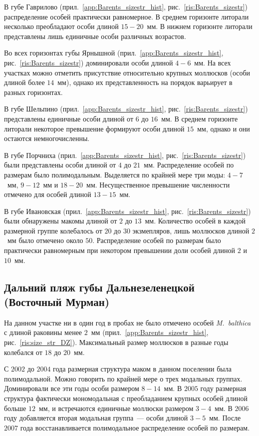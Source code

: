 В губе Гаврилово (прил.~\ref{app:Barents_sizestr_hist}, рис.~\ref{ris:Barents_sizestr}) распределение особей практически равномерное. 
В среднем горизонте литорали несколько преобладают особи длиной $15-20$~мм. 
В нижнем горизонте литорали представлены лишь единичные особи различных возрастов.	

Во всех горизонтах губы Ярнышной (прил.~\ref{app:Barents_sizestr_hist}, рис.~\ref{ris:Barents_sizestr}) доминировали особи длиной $4-6$~мм. 
На всех участках можно отметить присутствие относительно крупных моллюсков (особи длиной более $14$~мм), однако их представленность на порядок варьирует в разных горизонтах.

В губе Шельпино (прил.~\ref{app:Barents_sizestr_hist}, рис.~\ref{ris:Barents_sizestr})  представлены единичные особи длиной от $6$ до $16$~мм. 
В среднем горизонте литорали некоторое превышение формируют особи длиной $15$~мм, однако и они остаются немногочисленны.

В губе Порчниха (прил.~\ref{app:Barents_sizestr_hist}, рис.~\ref{ris:Barents_sizestr}) были представлены особи длиной от $4$ до $21$~мм. 
Распределение особей по размерам было полимодальным. 
Выделяется по крайней мере три моды: $4-7$~мм, $9-12$~мм и $18-20$~мм. 
Несущественное превышение численности  отмечено для особей длиной $13-15$~мм.

В губе Ивановская (прил.~\ref{app:Barents_sizestr_hist}, рис.~\ref{ris:Barents_sizestr}) были обнаружены макомы длиной от $2$ до $13$~мм. 
Количество особей в каждой размерной группе колебалось от $20$ до $30$ экзмепляров, лишь моллюсков длиной $2$~мм было отмечено около $50$. 
Распределение особей по размерам было практически равномерным при некотором превышении доли особей длиной $2$ и $10$~мм. 

		\subsection{Дальний пляж губы Дальнезеленецкой (Восточный Мурман)}
На данном участке ни в один год в пробах не было отмечено особей {\it M.~balthica} с длиной раковины менее $2$~мм (прил.~\ref{app:Barents_sizestr_hist}, рис.~\ref{ris:size_str_DZ}). 
Максимальный размер моллюсков в разные годы колебался от $18$ до $20$~мм. 

С $2002$ до $2004$ года размерная структура маком в данном поселении была полимодальной. 
Можно говорить по крайней мере о трех модальных группах.
Доминировали все эти годы особи размером $8 - 14$~мм.
В $2005$ году размерная структура фактически мономодальная с преобладанием крупных особей длиной больше $12$~мм, и встречаются единичные моллюски размером $3 - 4$~мм.
В $2006$ году добавляется вторая модальная группа~--- особи длиной $3 - 5$~мм.
После $2007$ года восстанавливается полимодальное распределение особей по размерам.



